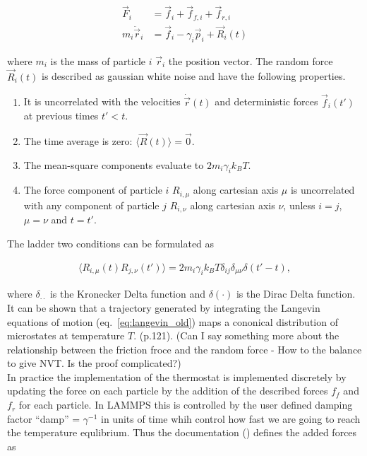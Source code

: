 \newpage

\begin{align}
  \vec{F}_i &= \vec{f}_{i} + \vec{f}_{f,i} + \vec{f}_{r,i} \nonumber \\
  m_i \ddot{\vec{r}}_i &= \vec{f}_{i} - \gamma_i \vec{p}_i + \vec{R}_i(t)
  \label{eq:langevin_old}
\end{align}

where $m_i$ is the mass of particle $i$ $\vec{r}_i$ the position vector. The random force $\vec{R}_i(t)$ is described as gaussian white noise and have the following properties. 

\begin{enumerate}
  \item It is uncorrelated with the velocities $\dot{\vec{r}}(t)$ and deterministic forces $\vec{f}_i(t')$ at previous times $t' < t$.
  \item The time average is zero: $\langle \vec{R}(t) \rangle = \vec{0}$.
  \item The mean-square components evaluate to $2m_i\gamma_i k_B T$.
  \item The force component of particle $i$ $R_{i,\mu}$ along cartesian axis $\mu$ is uncorrelated with any component of particle $j$ $R_{i,\nu}$ along cartesian axis $\nu$, unless $i=j$, $\mu=\nu$ and $t=t'$.
\end{enumerate}

The ladder two conditions can be formulated as

\begin{align*}
  \langle R_{i,\mu}(t) R_{j,\nu}(t') \rangle = 2m_i \gamma_i k_B T  \delta_{ij} \delta_{\mu\nu}\delta(t'-t),  
\end{align*}

where $\delta_{\cdot\cdot}$ is the Kronecker Delta function and $\delta(\cdot)$ is the Dirac Delta function. It can be shown that a trajectory generated by integrating the Langevin equations of motion (eq.~\eqref{eq:langevin_old}) maps a cononical distribution of microstates at temperature $T$. \cite{Hunenberger2005}(p.121). (Can I say something more about the relationship between the friction froce and the random force - How to the balance to give NVT. Is the proof complicated?)\\

In practice the implementation of the thermostat is implemented discretely by updating the force on each particle by the addition of the described forces $f_f$ and $f_r$ for each particle. In LAMMPS this is controlled by the user defined damping factor ``damp'' = $\gamma^{-1}$ in units of time whih control how fast we are going to reach the temperature equlibrium. Thus the documentation (\cite{docs_lammps_langevin}) defines the added forces as

